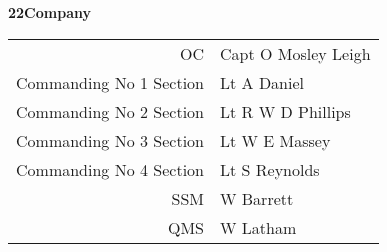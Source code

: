 \pagebreak

\begin{center}
  \Large
  \textbf{22\nd Company}
\end{center}

\vspace*{3mm}

\begin{center}
  \begin{tabular}{rl}
    OC & Capt O Mosley Leigh \\
    Commanding No 1 Section & Lt A Daniel \\
    Commanding No 2 Section & Lt R W D Phillips \\
    Commanding No 3 Section & Lt W E Massey \\
    Commanding No 4 Section & Lt S Reynolds \\
    SSM & W Barrett \\
    QMS & W Latham \\
  \end{tabular}
\end{center}

\vspace*{3mm}

